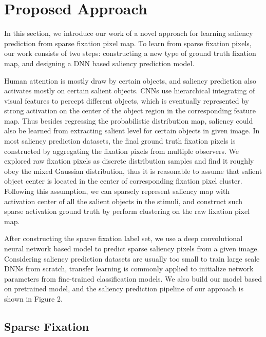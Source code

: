 \documentclass[letterpaper, 10 pt, conference]{ieeeconf}  %
\begin{document}
\section{Proposed Approach}

\par In this section, we introduce our work of a novel approach for learning saliency prediction from sparse fixation pixel map. To learn from sparse fixation pixels, our work consists of two steps: constructing a new type of ground truth fixation map, and designing a DNN based saliency prediction model.

\par Human attention is mostly draw by certain objects, and saliency prediction also activates mostly on certain salient objects. CNNs use hierarchical integrating of visual features to percept different objects, which is eventually represented by strong activation on the center of the object region in the corresponding feature map. Thus besides regressing the probabilistic distribution map, saliency could also be learned from extracting salient level for certain objects in given image. In most saliency prediction datasets, the final ground truth fixation pixels is constructed by aggregating the fixation pixels from multiple observers. We explored raw fixation pixels as discrete distribution samples and find it roughly obey the mixed Gaussian distribution, thus it is reasonable to assume that salient object center is located in the center of corresponding fixation pixel cluster. Following this assumption, we can sparsely represent saliency map with activation center of all the salient objects in the stimuli, and construct such sparse activation ground truth by perform clustering on the raw fixation pixel map.

\par After constructing the sparse fixation label set, we use a deep convolutional neural network based model to predict sparse saliency pixels from a given image. Considering saliency prediction datasets are usually too small to train large scale DNNs from scratch, transfer learning is commonly applied to initialize network parameters from fine-trained classification models. We also build our model based on pretrained model, and the saliency prediction pipeline of our approach is shown in Figure 2.

\subsection{Sparse Fixation}
\end{document}
